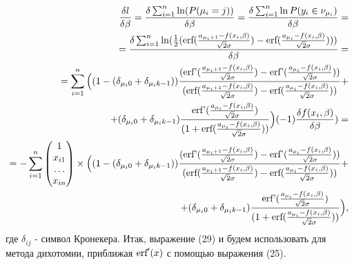 \documentclass[12pt]{article}
\begin{document}
\begin{eqnarray}
    \frac{\delta l}{\delta \beta}=\frac{\delta \sum_{i=1}^{n}\ln(P(\mu_i=j))}{\delta \beta}=\frac{\delta \sum_{i=1}^{n}\ln P(y_i\in \nu_{\mu_i})}{\delta \beta}=\\
    =\frac{\delta \sum_{i=1}^{n} \ln(\frac{1}{2}(\textup{erf}(\frac{a_{\mu_i+1}-f(x_i,\beta)}{\sqrt{2}\sigma})-\textup{erf}(\frac{a_{\mu_i}-f(x_i,\beta)}{\sqrt{2}\sigma})) )         }{\delta \beta}=\\
    =  \sum_{i=1}^{n}\Big((1-(\delta_{\mu_i 0}+\delta_{\mu_i k-1}))\frac{(\textup{erf'}(\frac{a_{\mu_i+1}-f(x_i,\beta)}{\sqrt{2}\sigma})-\textup{erf'}(\frac{a_{\mu_i}-f(x_i,\beta)}{\sqrt{2}\sigma}))}{ (\textup{erf}(\frac{a_{\mu_i+1}-f(x_i,\beta)}{\sqrt{2}\sigma})-\textup{erf}(\frac{a_{\mu_i}-f(x_i,\beta)}{\sqrt{2}\sigma}))}+\\
    \nonumber +(\delta_{\mu_i 0}+\delta_{\mu_i k-1})\frac{\textup{erf'}(\frac{a_{\mu_i}-f(x_i,\beta)}{\sqrt{2}\sigma})}{(1+\textup{erf}(\frac{a_{\mu_i}-f(x_i,\beta)}{\sqrt{2}\sigma}))}\Big)  (-1) \frac{\delta f(x_i,\beta)}{\delta \beta} )=\\
    =-\sum_{i=1}^{n}\begin{pmatrix}
        1\\
        x_{i1}\\
        \dots\\
        x_{in}
    \end{pmatrix}\times  \Big((1-(\delta_{\mu_i 0}+\delta_{\mu_i k-1}))\frac{(\textup{erf'}(\frac{a_{\mu_i+1}-f(x_i,\beta)}{\sqrt{2}\sigma})-\textup{erf'}(\frac{a_{\mu_i}-f(x_i,\beta)}{\sqrt{2}\sigma}))}{ (\textup{erf}(\frac{a_{\mu_i+1}-f(x_i,\beta)}{\sqrt{2}\sigma})-\textup{erf}(\frac{a_{\mu_i}-f(x_i,\beta)}{\sqrt{2}\sigma}))}+\\
    \nonumber +(\delta_{\mu_i 0}+\delta_{\mu_i k-1})\frac{\textup{erf'}(\frac{a_{\mu_i}-f(x_i,\beta)}{\sqrt{2}\sigma})}{(1+\textup{erf}(\frac{a_{\mu_i}-f(x_i,\beta)}{\sqrt{2}\sigma}))}\Big)  ,
\end{eqnarray}
где $\delta_{ij}$ - символ Кронекера.\hfill\break
Итак, выражение (29) и будем использовать для метода дихотомии, приближая $\textup{erf}'(x)$ с помощью выражения (25).
\end{document}
